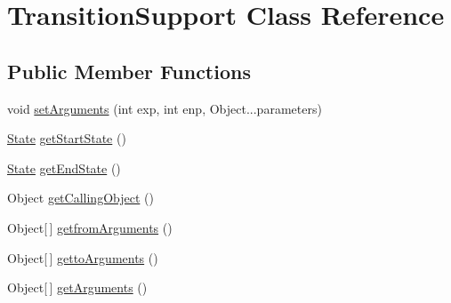 \hypertarget{class_transition_support}{\section{Transition\-Support Class Reference}
\label{class_transition_support}
}
\subsection*{Public Member Functions}
\begin{DoxyCompactItemize}
\item 
void \hyperlink{class_transition_support_a7b69faa809da771794eb7293cb444f9c}{set\-Arguments} (int exp, int enp, Object...\-parameters)
\item 
\hyperlink{class_state}{State} \hyperlink{class_transition_support_a0a9f0d558c6f6e9024c0384a7f831e4f}{get\-Start\-State} ()
\item 
\hyperlink{class_state}{State} \hyperlink{class_transition_support_a6c0772c22388fe100e92588ac2734469}{get\-End\-State} ()
\item 
Object \hyperlink{class_transition_support_a420f5aff45ea69e01190c45288f7e7a4}{get\-Calling\-Object} ()
\item 
Object\mbox{[}$\,$\mbox{]} \hyperlink{class_transition_support_a3ce6e760ca114f388edd663b650f87f0}{getfrom\-Arguments} ()
\item 
Object\mbox{[}$\,$\mbox{]} \hyperlink{class_transition_support_a99189bbaa88a9cc76597b71b4145f31d}{getto\-Arguments} ()
\item 
Object\mbox{[}$\,$\mbox{]} \hyperlink{class_transition_support_a8985efe149e070d9f43e17c9d9384b1b}{get\-Arguments} ()
\end{DoxyCompactItemize}


